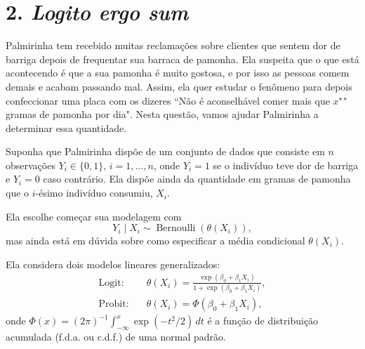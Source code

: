 \documentclass[a4paper,10pt, notitlepage]{report}
\begin{document}
\section*{2. \textit{Logito ergo sum}} 

Palmirinha tem recebido muitas reclamações sobre clientes que sentem dor de barriga depois de frequentar sua barraca de pamonha.
Ela suspeita que o que está acontecendo é que a sua pamonha é muito gostosa, e por isso as pessoas comem demais e acabam passando mal.
Assim, ela quer estudar o fenômeno para depois confeccionar uma placa com os dizeres ``Não é aconselhável comer mais que $x^{\star\star}$ gramas de pamonha por dia".
Nesta questão, vamos ajudar Palmirinha a determinar essa quantidade.

Suponha que Palmirinha dispõe de um conjunto de dados que consiste em $n$ observações $Y_i \in \{0, 1\}$, $i = 1, \ldots, n$, onde $Y_i = 1$ se o indivíduo teve dor de barriga e  $Y_i = 0$ caso contrário.
Ela dispõe ainda da quantidade em gramas de pamonha que o $i$-ésimo indivíduo consumiu, $X_i$.

Ela escolhe começar sua modelagem com 
\begin{equation}
\label{eq:bern}
    Y_i \mid X_i \sim \operatorname{Bernoulli}(\theta(X_i)),
\end{equation}
mas ainda está em dúvida sobre como especificar a média condicional $\theta(X_i)$.

Ela considera dois modelos lineares generalizados:
\begin{align*}
    \text{Logit}:\quad & \theta(X_i) = \frac{\exp\left(\beta_0 + \beta_1 X_i\right)}{1 + \exp\left(\beta_0 + \beta_1 X_i\right)}, \\
    \text{Probit}: \quad & \theta(X_i) = \Phi\left(\beta_0 + \beta_1 X_i\right),
\end{align*}
onde $\Phi(x) = (2\pi)^{-1}\int_{-\infty}^x \exp(-t^2/2)\,dt$ é a função de distribuição acumulada (f.d.a. ou c.d.f.) de uma normal padrão.
\end{document}

